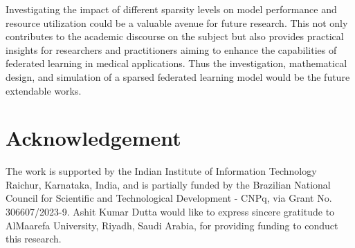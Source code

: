 \documentclass[conference]{IEEEtran}
\begin{document}
Investigating the impact of different sparsity levels on model performance and resource utilization could be a valuable avenue for future research. This not only contributes to the academic discourse on the subject but also provides practical insights for researchers and practitioners aiming to enhance the capabilities of federated learning in medical applications. Thus the investigation, mathematical design, and simulation of a sparsed federated learning model would be the future extendable works.

\section*{Acknowledgement} The work is supported by the Indian Institute of Information Technology Raichur, Karnataka, India, and is partially funded by the Brazilian National Council for Scientific and Technological Development - CNPq, via Grant No. 306607/2023-9. Ashit Kumar Dutta would like to express sincere gratitude to AlMaarefa University, Riyadh, Saudi Arabia, for providing funding to conduct this research.
\end{document}
